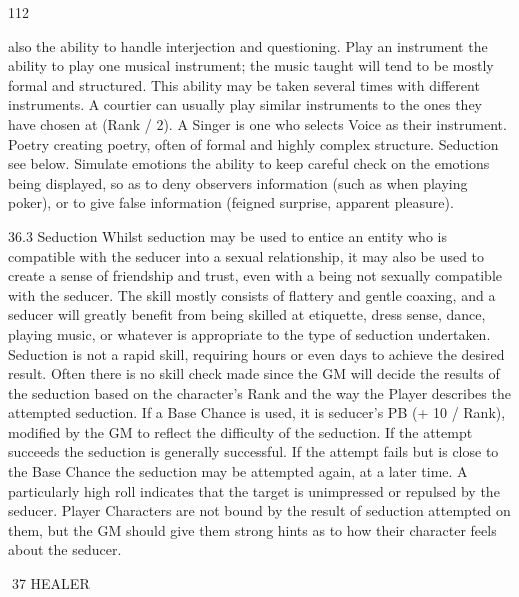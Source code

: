 \documentclass[a4paper]{article}
\begin{document}
\begin{multicols}{3}
112

also the ability to handle interjection and questioning.
Play an instrument the ability to play one musical
instrument; the music taught will tend to be mostly
formal and structured. This ability may be taken
several times with different instruments. A courtier
can usually play similar instruments to the ones
they have chosen at (Rank / 2). A Singer is one
who selects Voice as their instrument.
Poetry creating poetry, often of formal and highly
complex structure.
Seduction see below.
Simulate emotions the ability to keep careful
check on the emotions being displayed, so as to
deny observers information (such as when playing
poker), or to give false information (feigned surprise, apparent pleasure).

36.3 Seduction
Whilst seduction may be used to entice an entity
who is compatible with the seducer into a sexual
relationship, it may also be used to create a sense
of friendship and trust, even with a being not sexually compatible with the seducer. The skill mostly
consists of flattery and gentle coaxing, and a seducer will greatly benefit from being skilled at
etiquette, dress sense, dance, playing music, or
whatever is appropriate to the type of seduction
undertaken. Seduction is not a rapid skill, requiring
hours or even days to achieve the desired result.
Often there is no skill check made since the GM
will decide the results of the seduction based on the
character’s Rank and the way the Player describes
the attempted seduction. If a Base Chance is used,
it is seducer’s PB (+ 10 / Rank), modified by the
GM to reflect the difficulty of the seduction. If the
attempt succeeds the seduction is generally successful. If the attempt fails but is close to the Base
Chance the seduction may be attempted again, at a
later time. A particularly high roll indicates that the
target is unimpressed or repulsed by the seducer.
Player Characters are not bound by the result of
seduction attempted on them, but the GM should
give them strong hints as to how their character
feels about the seducer.

37 HEALER


\end{multicols}
\end{document}
